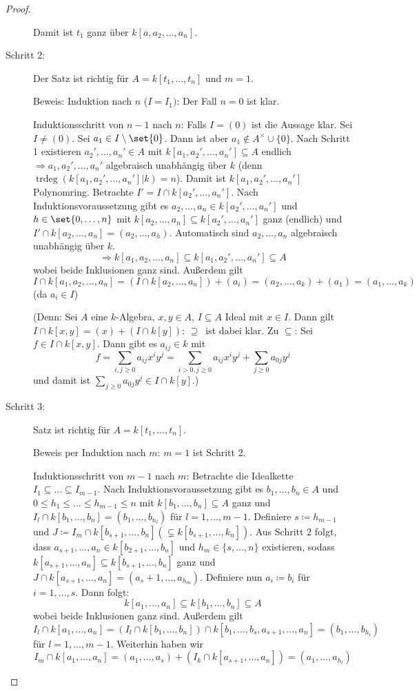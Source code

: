 \documentclass[12pt,a4paper]{scrartcl}
\theoremstyle{cplain}
\theoremstyle{cdef}
\begin{document}
\begin{proof}
\begin{description}
		Damit ist $t_1$ ganz über $k[a, a_2,\dots, a_n]$.
		\item[Schritt 2:] Der Satz ist richtig für $A = k[t_1,\dots, t_n]$ und $m = 1$.
		
		Beweis: Induktion nach $n$ ($I = I_1)$: Der Fall $n = 0$ ist klar.
		
		Induktionsschritt von $n-1$ nach $n$: Falls $I = (0)$ ist die Aussage klar. Sei $I \neq (0)$. Sei $a_1\in I\setminus\set{0}$. Dann ist aber $a_1\notin A^{\times}\cup\{0\}$. Nach Schritt 1 existieren $a_2', \dots, a_n'\in A$ mit $k[a_1, a_2',\dots, a_n']\subseteq A$ endlich $\Rightarrow a_1, a_2',\dots, a_n'$ algebraisch unabhängig über $k$ (denn $\operatorname{trdeg}(k[a_1,a_2',\dots, a_n']|k) = n$). Damit ist $k[a_1, a_2',\dots, a_n']$ Polynomring. Betrachte $I' = I\cap k[a_2',\dots, a_n']$. Nach Induktionsvoraussetzung gibt es $a_2,\dots, a_n\in k[a_2',\dots, a_n']$ und $h \in \set{0,\dots, n}$ mit $k[a_2,\dots, a_n]\subseteq k[a_2',\dots, a_n']$ ganz (endlich) und $I'\cap k[a_2,\dots, a_n] = (a_2,\dots, a_h)$.
		Automatisch sind $a_2,\dots, a_n$ algebraisch unabhängig über $k$.
		$$\Rightarrow k[a_1,a_2,\dots, a_n]\subseteq k[a_1,a_2',\dots, a_n']\subseteq A$$
		wobei beide Inklusionen ganz sind. Außerdem gilt
		$$I\cap k[a_1,a_2,\dots, a_n] = (I\cap k[a_2,\dots, a_n]) + (a_i) = (a_2, \dots, a_k) + (a_1) = (a_1,\dots, a_k)$$
		(da $a_i\in I$)
		
		(Denn: Sei $A$ eine $k$-Algebra, $x,y\in A$, $I\subseteq A$ Ideal mit $x\in I$. Dann gilt $I\cap k[x,y] = (x) + (I\cap k[y])$: \glqq$\supseteq$\grqq\ ist dabei klar. Zu \glqq$\subseteq$\grqq: Sei $f\in I\cap k[x,y]$. Dann gibt es $a_{ij}\in k$ mit
		$$f = \sum_{i,j\geq 0}a_{ij}x^iy^j = \sum_{i>0, j\geq0}a_{ij}x^{i}y^j + \sum_{j\geq 0} a_{0j}y^j$$
		und damit ist $\sum_{j\geq 0}a_{0j}y^j\in I\cap k[y]$.)
		
		\item[Schritt 3:] Satz ist richtig für $ A = k[t_1,\dots, t_n]$.
		
		Beweis per Induktion nach $m$: $m = 1$ ist Schritt 2.
		
		Induktionsschritt von $m-1$ nach $m$: Betrachte die Idealkette $I_1\subseteq\dots\subseteq I_{m-1}$. Nach Induktionsvoraussetzung gibt es $b_1,\dots, b_n\in A$ und $0\leq h_1\leq\dots\leq h_{m-1}\leq n$ mit $k[b_1,\dots, b_n]\subseteq A$ ganz und $I_l\cap k[b_1,\dots, b_n] = (b_1,\dots, b_{n_l})$ für $l = 1,\dots, m-1$. Definiere $s\coloneqq h_{m-1}$ und $J\coloneqq I_m\cap k[b_{s+1},\dots, b_n] (\subsetneq k[b_{s+1},\dots, k_n])$. Aus Schritt 2 folgt, dass $a_{s+1}, \dots, a_n\in k[b_{2+1},\dots, b_n]$ und $h_m\in \{s,\dots, n\}$ existieren, sodass $k[a_{s+1},\dots, a_n]\subseteq k[b_{s+1},\dots, b_n]$ ganz und $J\cap k[a_{s+1},\dots, a_n] = (a_s+1,\dots, a_{h_m})$. Definiere nun $a_i\coloneqq b_i$ für $i = 1,\dots, s$. Dann folgt:
		$$k[a_1,\dots, a_n] \subseteq k[b_1,\dots, b_n]\subseteq A$$
		wobei beide Inklusionen ganz sind. Außerdem gilt
		$$I_l\cap k[a_1,\dots, a_n] = (I_l\cap k[b_1,\dots, b_n])\cap k[b_1,\dots, b_s, a_{s+1},\dots, a_n] = (b_1,\dots, b_{h_l})$$
		für $l = 1,\dots, m-1$. Weiterhin haben wir 
		$$I_m\cap k[a_1,\dots, a_n] = (a_1,\dots, a_s)+(I_k\cap k[a_{s+1},\dots, a_n]) = (a_1,\dots, a_{h_l})$$
		

\end{description}
\end{proof}
\end{document}
